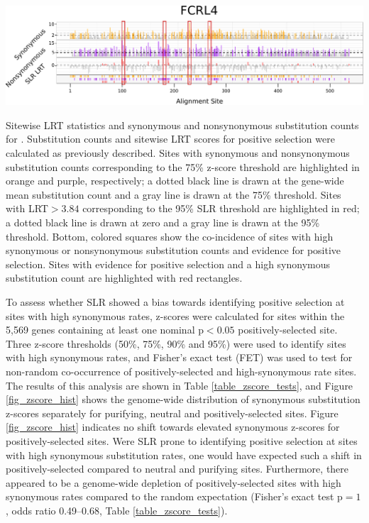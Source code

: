 \bbfig
\centering
\includegraphics[scale=0.7]{Figs/zscore_sites.pdf}
\caption{Sitewise LRT statistics and synonymous and nonsynonymous
  substitution counts for . Substitution counts and
  sitewise LRT scores for positive selection were calculated as
  previously described. Sites with synonymous and nonsynonymous
  substitution counts corresponding to the 75\% z-score threshold are
  highlighted in orange and purple, respectively; a dotted black line
  is drawn at the gene-wide mean substitution count and a gray line is
  drawn at the 75\% threshold. Sites with LRT$>3.84$ corresponding to
  the 95\% SLR threshold are highlighted in red; a dotted black line
  is drawn at zero and a gray line is drawn at the 95\%
  threshold. Bottom, colored squares show the co-incidence of sites
  with high synonymous or nonsynonymous substitution counts and
  evidence for positive selection. Sites with evidence for positive
  selection and a high synonymous substitution count are highlighted
  with red rectangles.}
\label{fig_zscore_sites}
\eefig


To assess whether SLR showed a bias towards identifying positive
selection at sites with high synonymous rates, z-scores were
calculated for sites within the 5,569 genes containing at least one
nominal p$<0.05$ positively-selected site. Three z-score thresholds
(50\%, 75\%, 90\% and 95\%) were used to identify sites with high
synonymous rates, and Fisher's exact test (FET) was used to test for
non-random co-occurrence of positively-selected and high-synonymous
rate sites. The results of this analysis are shown in Table
\ref{table_zscore_tests}, and Figure \ref{fig_zscore_hist} shows the
genome-wide distribution of synonymous substitution z-scores
separately for purifying, neutral and positively-selected sites.
Figure \ref{fig_zscore_hist} indicates no shift towards elevated
synonymous z-scores for positively-selected sites. Were SLR prone to
identifying positive selection at sites with high synonymous
substitution rates, one would have expected such a shift in
positively-selected compared to neutral and purifying
sites. Furthermore, there appeared to be a genome-wide depletion of
positively-selected sites with high synonymous rates compared to the
random expectation (Fisher's exact test p$=1$, odds ratio 0.49--0.68,
Table \ref{table_zscore_tests}).

